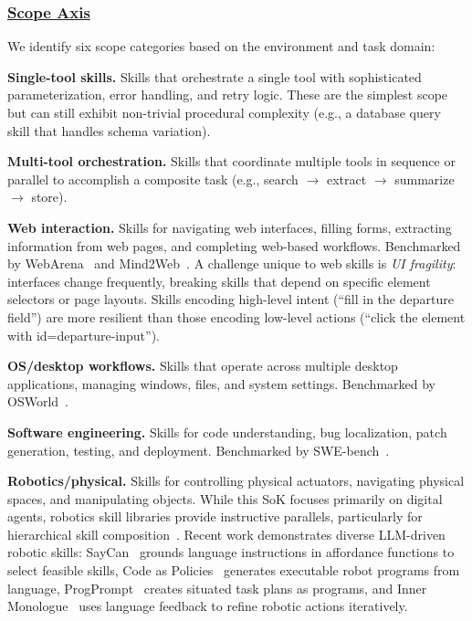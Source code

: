 \documentclass[conference, compsoc]{IEEEtran}
\theoremstyle{plain}
\newcommand{\para}[1]{\smallskip\noindent\textbf{#1.}}
\begin{document}
\subsubsection{\underline{Scope Axis}}
\label{sec:taxonomy:scope}

We identify six scope categories based on the environment and task domain:

\para{Single-tool skills} Skills that orchestrate a single tool with sophisticated parameterization, error handling, and retry logic. These are the simplest scope but can still exhibit non-trivial procedural complexity (e.g., a database query skill that handles schema variation).

\para{Multi-tool orchestration} Skills that coordinate multiple tools in sequence or parallel to accomplish a composite task (e.g., search $\rightarrow$ extract $\rightarrow$ summarize $\rightarrow$ store).

\para{Web interaction} Skills for navigating web interfaces, filling forms, extracting information from web pages, and completing web-based workflows. Benchmarked by WebArena~\cite{zhou2024webarena} and Mind2Web~\cite{deng2023mind2web}. A challenge unique to web skills is \emph{UI fragility}: interfaces change frequently, breaking skills that depend on specific element selectors or page layouts. Skills encoding high-level intent (``fill in the departure field'') are more resilient than those encoding low-level actions (``click the element with id=departure-input'').

\para{OS/desktop workflows} Skills that operate across multiple desktop applications, managing windows, files, and system settings. Benchmarked by OSWorld~\cite{xie2024osworld}.

\para{Software engineering} Skills for code understanding, bug localization, patch generation, testing, and deployment. Benchmarked by SWE-bench~\cite{jimenez2024swebench}.

\para{Robotics/physical} Skills for controlling physical actuators, navigating physical spaces, and manipulating objects. While this SoK focuses primarily on digital agents, robotics skill libraries provide instructive parallels, particularly for hierarchical skill composition~\cite{ravichandar2020robotlfd}. Recent work demonstrates diverse LLM-driven robotic skills: SayCan~\cite{ahn2022saycan} grounds language instructions in affordance functions to select feasible skills, Code as Policies~\cite{liang2023code} generates executable robot programs from language, ProgPrompt~\cite{singh2023progprompt} creates situated task plans as programs, and Inner Monologue~\cite{huang2022innermonologue} uses language feedback to refine robotic actions iteratively.
\end{document}
